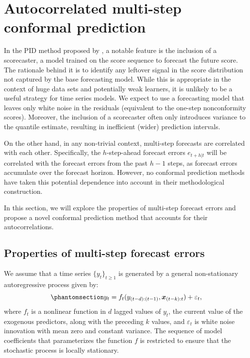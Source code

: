 \documentclass[
  11pt,
  a4paper,
]{article}
\theoremstyle{plain}
\theoremstyle{remark}
\begin{document}
\section{Autocorrelated multi-step conformal
prediction}\label{sec-acmcp}

In the PID method proposed by \textcite{angelopoulos2024}, a notable
feature is the inclusion of a scorecaster, a model trained on the score
sequence to forecast the future score. The rationale behind it is to
identify any leftover signal in the score distribution not captured by
the base forecasting model. While this is appropriate in the context of
huge data sets and potentially weak learners, it is unlikely to be a
useful strategy for time series models. We expect to use a forecasting
model that leaves only white noise in the residuals (equivalent to the
one-step nonconformity scores). Moreover, the inclusion of a scorecaster
often only introduces variance to the quantile estimate, resulting in
inefficient (wider) prediction intervals.

On the other hand, in any non-trivial context, multi-step forecasts are
correlated with each other. Specifically, the \(h\)-step-ahead forecast
errors \(e_{t+h|t}\) will be correlated with the forecast errors from
the past \(h-1\) steps, as forecast errors accumulate over the forecast
horizon. However, no conformal prediction methods have taken this
potential dependence into account in their methodological construction.

In this section, we will explore the properties of multi-step forecast
errors and propose a novel conformal prediction method that accounts for
their autocorrelations.

\subsection{Properties of multi-step forecast errors}\label{sec-ppt}

We assume that a time series \(\{y_t\}_{t \geq 1}\) is generated by a
general non-stationary autoregressive process given by:
\begin{equation}\phantomsection\label{eq-dgp}{
y_t = f_{t}(y_{(t-d):(t-1)},\bm{x}_{(t-k):t}) + \varepsilon_t,
}\end{equation} where \(f_{t}\) is a nonlinear function in \(d\) lagged
values of \(y_t\), the current value of the exogenous predictors, along
with the preceding \(k\) values, and \(\varepsilon_t\) is white noise
innovation with mean zero and constant variance. The sequence of model
coefficients that parameterizes the function \(f\) is restricted to
ensure that the stochastic process is locally stationary.
\end{document}
